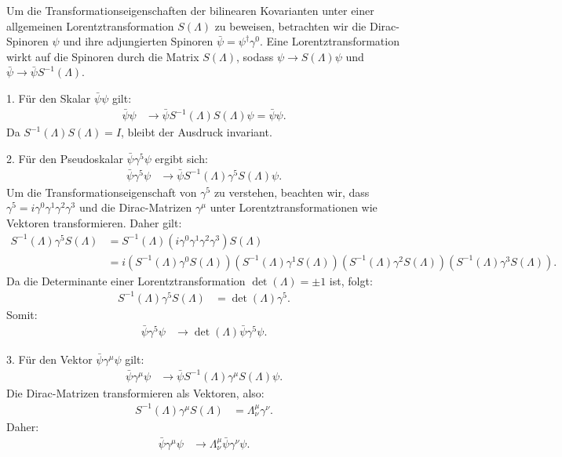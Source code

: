 Um die Transformationseigenschaften der bilinearen Kovarianten unter einer allgemeinen Lorentztransformation \( S(\Lambda) \) zu beweisen, betrachten wir die Dirac-Spinoren \(\psi\) und ihre adjungierten Spinoren \(\bar{\psi} = \psi^\dagger \gamma^0\). Eine Lorentztransformation wirkt auf die Spinoren durch die Matrix \( S(\Lambda) \), sodass \(\psi \rightarrow S(\Lambda) \psi\) und \(\bar{\psi} \rightarrow \bar{\psi} S^{-1}(\Lambda)\).

1. Für den Skalar \(\bar{\psi} \psi\) gilt:
\begin{align*}
\bar{\psi} \psi &\rightarrow \bar{\psi} S^{-1}(\Lambda) S(\Lambda) \psi = \bar{\psi} \psi.
\end{align*}
Da \(S^{-1}(\Lambda) S(\Lambda) = I\), bleibt der Ausdruck invariant.

2. Für den Pseudoskalar \(\bar{\psi} \gamma^5 \psi\) ergibt sich:
\begin{align*}
\bar{\psi} \gamma^5 \psi &\rightarrow \bar{\psi} S^{-1}(\Lambda) \gamma^5 S(\Lambda) \psi.
\end{align*}
Um die Transformationseigenschaft von \(\gamma^5\) zu verstehen, beachten wir, dass \(\gamma^5 = i\gamma^0\gamma^1\gamma^2\gamma^3\) und die Dirac-Matrizen \(\gamma^\mu\) unter Lorentztransformationen wie Vektoren transformieren. Daher gilt:
\begin{align*}
S^{-1}(\Lambda) \gamma^5 S(\Lambda) &= S^{-1}(\Lambda) (i\gamma^0\gamma^1\gamma^2\gamma^3) S(\Lambda) \\
&= i (S^{-1}(\Lambda) \gamma^0 S(\Lambda))(S^{-1}(\Lambda) \gamma^1 S(\Lambda))(S^{-1}(\Lambda) \gamma^2 S(\Lambda))(S^{-1}(\Lambda) \gamma^3 S(\Lambda)).
\end{align*}
Da die Determinante einer Lorentztransformation \(\operatorname{det}(\Lambda) = \pm 1\) ist, folgt:
\begin{align*}
S^{-1}(\Lambda) \gamma^5 S(\Lambda) &= \operatorname{det}(\Lambda) \gamma^5.
\end{align*}
Somit:
\begin{align*}
\bar{\psi} \gamma^5 \psi &\rightarrow \operatorname{det}(\Lambda) \bar{\psi} \gamma^5 \psi.
\end{align*}

3. Für den Vektor \(\bar{\psi} \gamma^\mu \psi\) gilt:
\begin{align*}
\bar{\psi} \gamma^\mu \psi &\rightarrow \bar{\psi} S^{-1}(\Lambda) \gamma^\mu S(\Lambda) \psi.
\end{align*}
Die Dirac-Matrizen transformieren als Vektoren, also:
\begin{align*}
S^{-1}(\Lambda) \gamma^\mu S(\Lambda) &= \Lambda_\nu^\mu \gamma^\nu.
\end{align*}
Daher:
\begin{align*}
\bar{\psi} \gamma^\mu \psi &\rightarrow \Lambda_\nu^\mu \bar{\psi} \gamma^\nu \psi.
\end{align*}

